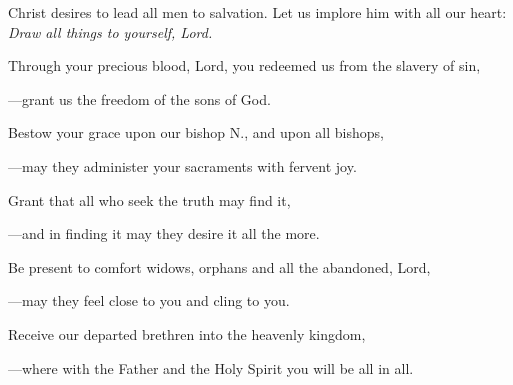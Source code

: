 \intercessions\indent

\begin{hangpar}

Christ desires to lead all men to salvation. Let us implore him with all our heart:\\
\emph{Draw all things to yourself, Lord.}

\medskip Through your precious blood, Lord, you redeemed us from the slavery of sin,

{\color{red}---\thinspace}grant us the freedom of the sons of God.

\medskip Bestow your grace upon our bishop N., and upon all bishops,

{\color{red}---\thinspace}may they administer your sacraments with fervent joy.

\medskip Grant that all who seek the truth may find it,

{\color{red}---\thinspace}and in finding it may they desire it all the more.

\medskip Be present to comfort widows, orphans and all the abandoned, Lord,

{\color{red}---\thinspace}may they feel close to you and cling to you.

\medskip Receive our departed brethren into the heavenly kingdom,

{\color{red}---\thinspace}where with the Father and the Holy Spirit you will be all in all.

\end{hangpar}

